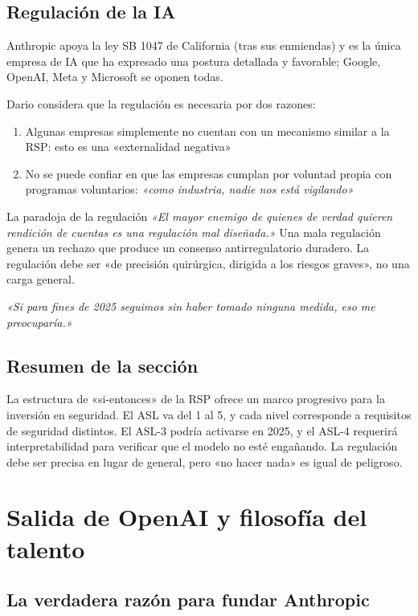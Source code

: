 \documentclass[a4paper]{article}
\begin{document}
\subsection{Regulación de la IA}

Anthropic apoya la ley SB 1047 de California (tras sus enmiendas) y es la única empresa de IA que ha expresado una postura detallada y favorable; Google, OpenAI, Meta y Microsoft se oponen todas.

Dario considera que la regulación es necesaria por dos razones:
\begin{enumerate}
    \item Algunas empresas simplemente no cuentan con un mecanismo similar a la RSP: esto es una «externalidad negativa»
    \item No se puede confiar en que las empresas cumplan por voluntad propia con programas voluntarios: \textit{«como industria, nadie nos está vigilando»}
\end{enumerate}

\begin{warningbox}{La paradoja de la regulación}
\textit{«El mayor enemigo de quienes de verdad quieren rendición de cuentas es una regulación mal diseñada.»} Una mala regulación genera un rechazo que produce un consenso antirregulatorio duradero. La regulación debe ser «de precisión quirúrgica, dirigida a los riesgos graves», no una carga general.

\textit{«Si para fines de 2025 seguimos sin haber tomado ninguna medida, eso me preocuparía.»}
\end{warningbox}

\subsection{Resumen de la sección}

La estructura de «si-entonces» de la RSP ofrece un marco progresivo para la inversión en seguridad. El ASL va del 1 al 5, y cada nivel corresponde a requisitos de seguridad distintos. El ASL-3 podría activarse en 2025, y el ASL-4 requerirá interpretabilidad para verificar que el modelo no esté engañando. La regulación debe ser precisa en lugar de general, pero «no hacer nada» es igual de peligroso.
\section{Salida de OpenAI y filosofía del talento}

\subsection{La verdadera razón para fundar Anthropic}
\end{document}
